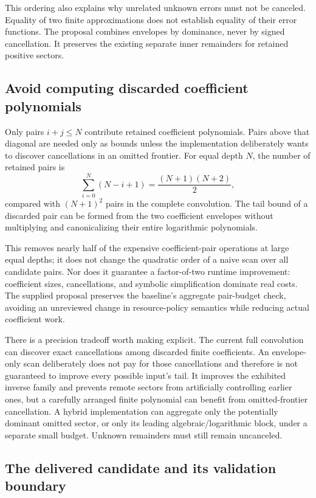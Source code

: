This ordering also explains why unrelated unknown errors must not be canceled. Equality of two finite approximations does not establish equality of their error functions. The proposal combines envelopes by dominance, never by signed cancellation. It preserves the existing separate inner remainders for retained positive sectors.

\subsection{Avoid computing discarded coefficient polynomials}

Only pairs $i+j\le N$ contribute retained coefficient polynomials. Pairs above that diagonal are needed only as bounds unless the implementation deliberately wants to discover cancellations in an omitted frontier. For equal depth $N$, the number of retained pairs is
\[
 \sum_{i=0}^{N}(N-i+1)=\frac{(N+1)(N+2)}2,
\]
compared with $(N+1)^2$ pairs in the complete convolution. The tail bound of a discarded pair can be formed from the two coefficient envelopes without multiplying and canonicalizing their entire logarithmic polynomials.

This removes nearly half of the expensive coefficient-pair operations at large equal depths; it does not change the quadratic order of a naive scan over all candidate pairs. Nor does it guarantee a factor-of-two runtime improvement: coefficient sizes, cancellations, and symbolic simplification dominate real costs. The supplied proposal preserves the baseline's aggregate pair-budget check, avoiding an unreviewed change in resource-policy semantics while reducing actual coefficient work.

There is a precision tradeoff worth making explicit. The current full convolution can discover exact cancellations among discarded finite coefficients. An envelope-only scan deliberately does not pay for those cancellations and therefore is not guaranteed to improve every possible input's tail. It improves the exhibited inverse family and prevents remote sectors from artificially controlling earlier ones, but a carefully arranged finite polynomial can benefit from omitted-frontier cancellation. A hybrid implementation can aggregate only the potentially dominant omitted sector, or only its leading algebraic/logarithmic block, under a separate small budget. Unknown remainders must still remain uncanceled.

\subsection{The delivered candidate and its validation boundary}

